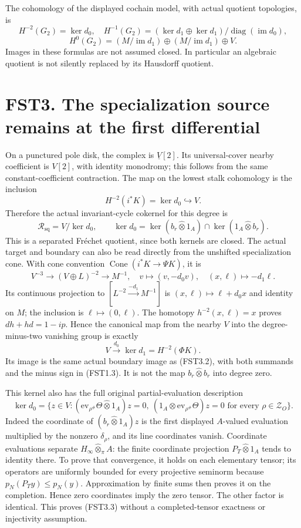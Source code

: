 The cohomology of the displayed cochain model, with actual quotient
topologies, is \[
H^{-2}(G_2)=\ker d_0,
\quad H^{-1}(G_2)=(\ker d_1\oplus\ker d_1)/\operatorname{diag}(\operatorname{im}d_0),
\] \[
H^0(G_2)=(M/\operatorname{im}d_1)\oplus(M/\operatorname{im}d_1)\oplus V.
\tag{FST2.5}
\] Images in these formulas are not assumed closed. In particular an
algebraic quotient is not silently replaced by its Hausdorff quotient.

\section{FST3. The specialization source remains at the first
differential}\label{fst3.-the-specialization-source-remains-at-the-first-differential}

On a punctured pole disk, the complex is \(\underline V[2]\). Its
universal-cover nearby coefficient is \(V[2]\), with identity monodromy;
this follows from the same constant-coefficient contraction. The map on
the lowest stalk cohomology is the inclusion \[
H^{-2}(i^*K)=\ker d_0\hookrightarrow V.
\tag{FST3.1}
\] Therefore the actual invariant-cycle cokernel for this degree is \[
\mathcal R_{\mathrm{sq}}=V/\ker d_0,
\qquad \ker d_0=\ker(b_r\widehat\otimes1_A)\cap\ker(1_A\widehat\otimes b_r).
\tag{FST3.2}
\] This is a separated Fréchet quotient, since both kernels are closed.
The actual target and boundary can also be read directly from the
unshifted specialization cone. With cone convention
\(\operatorname{Cone}(i^*K\to\Psi K)\), it is \[
V^{-3}\longrightarrow(V\oplus L)^{-2}\longrightarrow M^{-1},
\quad v\longmapsto(v,-d_0v),\quad(x,\ell)\longmapsto-d_1\ell.
\tag{FST3.4}
\] Its continuous projection to \([L^{-2}\xrightarrow{-d_1}M^{-1}]\) is
\((x,\ell)\mapsto\ell+d_0x\) and identity on \(M\); the inclusion is
\(\ell\mapsto(0,\ell)\). The homotopy \(h^{-2}(x,\ell)=x\) proves
\(dh+hd=1-ip\). Hence the canonical map from the nearby \(V\) into the
degree-minus-two vanishing group is exactly \[
V\xrightarrow{d_0}\ker d_1=H^{-2}(\Phi K).
\tag{FST3.5}
\] Its image is the same actual boundary image as (FST3.2), with both
summands and the minus sign in (FST1.3). It is not the map
\(b_r\widehat\otimes b_r\) into degree zero.

This kernel also has the full original partial-evaluation description \[
\ker d_0=\{z\in V:
(\mathrm{ev}_{\rho^\#}\Theta\widehat\otimes1_A)z=0,
\ (1_A\widehat\otimes\mathrm{ev}_{\rho^\#}\Theta)z=0
\text{ for every }\rho\in\mathscr Z_O\}.
\tag{FST3.3}
\] Indeed the coordinate of \((b_r\widehat\otimes1_A)z\) is the first
displayed \(A\)-valued evaluation multiplied by the nonzero
\(\delta_\rho\), and its line coordinates vanish. Coordinate evaluations
separate \(H_\infty\widehat\otimes_\pi A\): the finite coordinate
projection \(P_T\widehat\otimes1_A\) tends to identity there. To prove
that convergence, it holds on each elementary tensor; its operators are
uniformly bounded for every projective seminorm because
\(p_N(P_Ty)\le p_N(y)\). Approximation by finite sums then proves it on
the completion. Hence zero coordinates imply the zero tensor. The other
factor is identical. This proves (FST3.3) without a completed-tensor
exactness or injectivity assumption.

